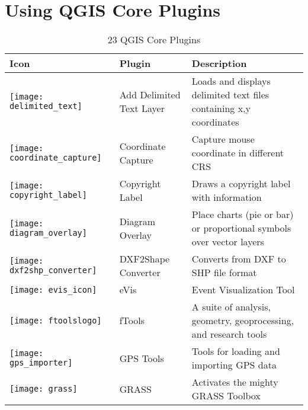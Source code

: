 
\section{Using QGIS Core Plugins}\label{sec:core_plugins}


\begin{minipage}{\textwidth}
\begin{table}[H]
\centering
\caption{23 QGIS Core Plugins}\label{tab:core_plugins}\medskip
\small
 \begin{tabular}{|l|l|p{4in}|}
\hline \textbf{Icon} & \textbf{Plugin} & \textbf{Description}\\
\hline
\texttt{[image: delimited\_text]}
 & Add Delimited Text Layer \index{plugins!delimited text} & Loads and displays delimited text files containing x,y coordinates\\
\hline
\texttt{[image: coordinate\_capture]}
 & Coordinate Capture \index{plugins!coordinate capture}& Capture mouse coordinate in different CRS\\
\hline 
\texttt{[image: copyright\_label]}
 & Copyright Label \index{plugins!copyright}& Draws a copyright label with information\\
\hline
\texttt{[image: diagram\_overlay]}
 & Diagram Overlay \index{plugins!diagram}& Place charts (pie or bar) or proportional symbols over vector layers\\
\hline
\texttt{[image: dxf2shp\_converter]}
 & DXF2Shape Converter \index{plugins!DXF2Shape}& Converts from DXF to SHP file format\\
\hline
\texttt{[image: evis\_icon]}
 & eVis & Event Visualization Tool \\
\hline
\texttt{[image: ftoolslogo]}
 & fTools \index{plugins!ftools}& A suite of analysis, geometry, geoprocessing, and research tools\\
\hline
\texttt{[image: gps\_importer]}
 & GPS Tools \index{plugins!gps}& Tools for loading and importing GPS data\\
\hline
\texttt{[image: grass]}
 & GRASS \index{plugin!grass toolbox} & Activates the mighty GRASS Toolbox\\

\end{tabular}
\end{table}
\end{minipage}
